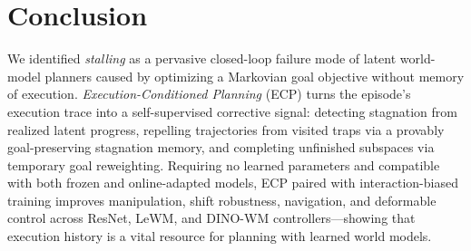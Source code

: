 \section{Conclusion}
We identified \emph{stalling} as a pervasive closed-loop failure mode of latent world-model planners caused by optimizing a Markovian goal objective without memory of execution. \emph{Execution-Conditioned Planning} (ECP) turns the episode's execution trace into a self-supervised corrective signal: detecting stagnation from realized latent progress, repelling trajectories from visited traps via a provably goal-preserving stagnation memory, and completing unfinished subspaces via temporary goal reweighting. Requiring no learned parameters and compatible with both frozen and online-adapted models, ECP paired with interaction-biased training improves manipulation, shift robustness, navigation, and deformable control across ResNet, LeWM, and DINO-WM controllers---showing that execution history is a vital resource for planning with learned world models.
